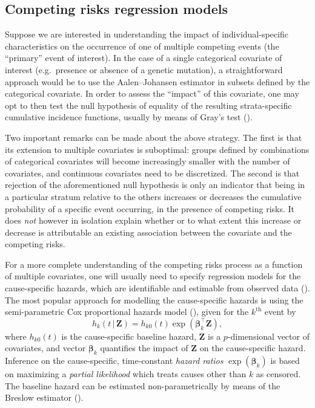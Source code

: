 \documentclass[
  letterpaper,
  DIV=11,
  numbers=noendperiod]{scrreprt}
\newcommand{\given}{\,|\,}
\begin{document}
\subsection{Competing risks regression
models}\label{competing-risks-regression-models}

Suppose we are interested in understanding the impact of
individual-specific characteristics on the occurrence of one of multiple
competing events (the ``primary'' event of interest). In the case of a
single categorical covariate of interest (e.g.~presence or absence of a
genetic mutation), a straightforward approach would be to use the
Aalen--Johansen estimator in subsets defined by the categorical
covariate. In order to assess the ``impact'' of this covariate, one may
opt to then test the null hypothesis of equality of the resulting
strata-specific cumulative incidence functions, usually by means of
Gray's test ().

Two important remarks can be made about the above strategy. The first is
that its extension to multiple covariates is suboptimal: groups defined
by combinations of categorical covariates will become increasingly
smaller with the number of covariates, and continuous covariates need to
be discretized. The second is that rejection of the aforementioned null
hypothesis is only an indicator that being in a particular stratum
relative to the others increases or decreases the cumulative probability
of a specific event occurring, in the presence of competing risks. It
does \emph{not} however in isolation explain whether or to what extent
this increase or decrease is attributable an existing association
between the covariate and the competing risks.

For a more complete understanding of the competing risks process as a
function of multiple covariates, one will usually need to specify
regression models for the cause-specific hazards, which are identifiable
and estimable from observed data
(). The most popular approach for modelling the cause-specific
hazards is using the semi-parametric Cox proportional hazards model
(), given for
the \(k^{\text{th}}\) event by \[
h_k(t \given \mathbf{Z}) = h_{k0}(t)\exp(\boldsymbol{\beta}_k^\intercal \mathbf{Z}),
\] where \(h_{k0}(t)\) is the cause-specific baseline hazard,
\(\mathbf{Z}\) is a \(p\)-dimensional vector of covariates, and vector
\(\boldsymbol{\beta}_k\) quantifies the impact of \(\mathbf{Z}\) on the
cause-specific hazard. Inference on the cause-specific, time-constant
\emph{hazard ratios} \(\exp(\boldsymbol{\beta}_k)\) is based on
maximizing a \emph{partial likelihood} which treats causes other than
\(k\) as censored. The baseline hazard can be estimated
non-parametrically by means of the Breslow estimator
().
\end{document}
